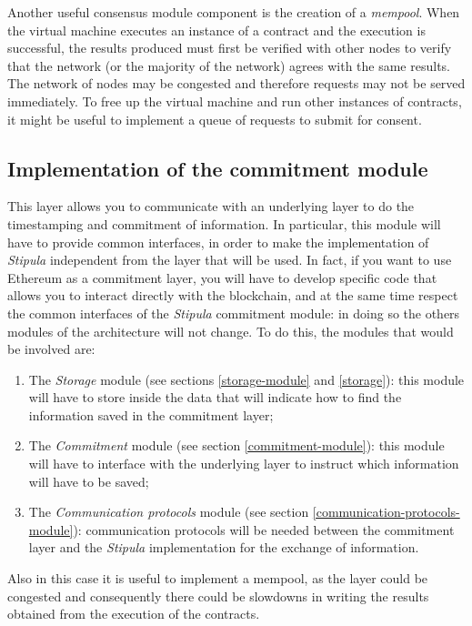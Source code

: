 Another useful consensus module component is the creation of a \textit{mempool}. When the virtual machine 
executes an instance of a contract and the execution is successful, the results produced must first be 
verified with other nodes to verify that the network (or the majority of the network) agrees with the same 
results. The network of nodes may be congested and therefore requests may not be served immediately. To free 
up the virtual machine and run other instances of contracts, it might be useful to implement a queue of 
requests to submit for consent.

\subsection{Implementation of the commitment module}

This layer allows you to communicate with an underlying layer to do the timestamping and commitment of 
information. In particular, this module will have to provide common interfaces, in order to make the 
implementation of \textit{Stipula} independent from the layer that will be used. In fact, if you want to 
use Ethereum as a commitment layer, you will have to develop specific code that allows you to interact 
directly with the blockchain, and at the same time respect the common interfaces of the \textit{Stipula} 
commitment module: in doing so the others modules of the architecture will not change. To do this, the 
modules that would be involved are:
\begin{enumerate}
  \item The \textit{Storage} module (see sections \ref{storage-module} and \ref{storage}): this module 
  will have to store inside the data that will indicate how to find the information saved in the 
  commitment layer;
  \item The \textit{Commitment} module (see section \ref{commitment-module}): this module will have to 
  interface with the underlying layer to instruct which information will have to be saved;
  \item The \textit{Communication protocols} module (see section \ref{communication-protocols-module}): 
  communication protocols will be needed between the commitment layer and the \textit{Stipula} 
  implementation for the exchange of information.
\end{enumerate}

Also in this case it is useful to implement a mempool, as the layer could be congested and consequently 
there could be slowdowns in writing the results obtained from the execution of the contracts.


